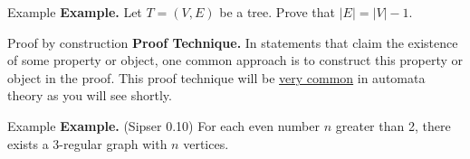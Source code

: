 \documentclass[10pt]{beamer}
\begin{document}
\begin{frame}[t]{Example}
    \textbf{Example.} Let $T = (V, E)$ be a tree. Prove that $|E| = |V| - 1$.
\end{frame}


\begin{frame}{Proof by construction}
    \textbf{Proof Technique.} In statements that claim the existence of some property or object, one common approach is to construct this property or object in the proof. This proof technique will be \underline{very common} in automata theory as you will see shortly.
\end{frame}

\begin{frame}[t]{Example}
    \textbf{Example.} (Sipser 0.10) For each even number $n$ greater than 2, there exists a 3-regular graph with $n$ vertices.
\end{frame}
\end{document}
